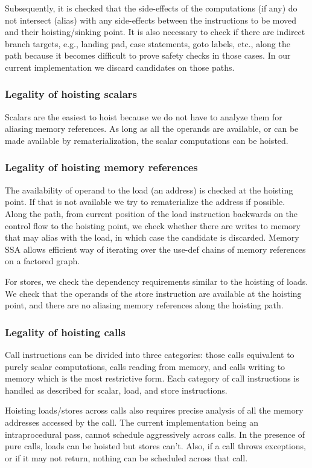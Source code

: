\documentclass[sigplan,10pt,review,anonymous]{acmart}\settopmatter{printfolios=true,printccs=false,printacmref=false}
\begin{document}
Subsequently, it is checked that the side-effects of the computations (if any)
do not intersect (alias) with any side-effects between the instructions to be
moved and their hoisting/sinking point. It is also necessary to check if there
are indirect branch targets, e.g., landing pad, case statements, goto labels,
etc., along the path because it becomes difficult to prove safety checks in
those cases. In our current implementation we discard candidates on those paths.

\subsubsection{Legality of hoisting scalars}
Scalars are the easiest to hoist because we do not have to analyze them for
aliasing memory references. As long as all the operands are available, or can be
made available by rematerialization, the scalar computations can be hoisted.

\subsubsection{Legality of hoisting memory references}
The availability of operand to the load (an address) is checked at the hoisting
point. If that is not available we try to rematerialize the address if possible.
Along the path, from current position of the load instruction backwards on the
control flow to the hoisting point, we check whether there are writes to memory
that may alias with the load, in which case the candidate is discarded. Memory
SSA allows efficient way of iterating over the use-def chains of memory
references on a factored graph.

For stores, we check the dependency requirements similar to the hoisting of
loads. We check that the operands of the store instruction are available at the
hoisting point, and there are no aliasing memory references along the hoisting
path.

\subsubsection{Legality of hoisting calls}
Call instructions can be divided into three categories: those calls equivalent
to purely scalar computations, calls reading from memory, and calls writing to
memory which is the most restrictive form.  Each category of call instructions
is handled as described for scalar, load, and store instructions.

Hoisting loads/stores across calls also requires precise analysis of all the
memory addresses accessed by the call. The current implementation being an
intraprocedural pass, cannot schedule aggressively across calls. In the presence
of pure calls, loads can be hoisted but stores can't. Also, if a call throws
exceptions, or if it may not return, nothing can be scheduled across that call.
\end{document}
